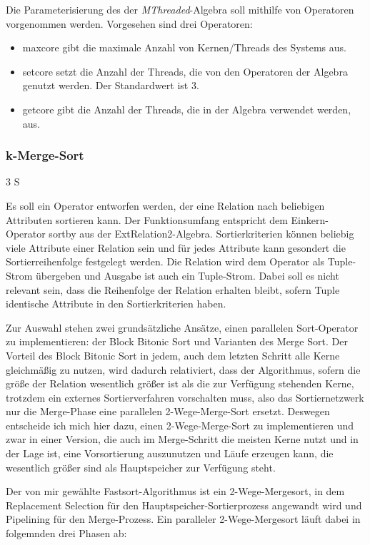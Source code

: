 \documentclass[a4paper,12pt,twoside]{article}
\newcommand{\Fb}[1]{\textit{#1}} %
\begin{document}
Die Parameterisierung des der \Fb{MThreaded}-Algebra soll mithilfe von Operatoren vorgenommen werden. Vorgesehen sind drei Operatoren:

\begin{itemize}
	\item maxcore gibt die maximale Anzahl von Kernen/Threads des Systems aus.
	\item setcore setzt die Anzahl der Threads, die von den Operatoren der Algebra genutzt werden. Der Standardwert ist 3.
	\item getcore gibt die Anzahl der Threads, die in der Algebra verwendet werden, aus.
\end{itemize}

\subsubsection{k-Merge-Sort} 3 S

Es soll ein Operator entworfen werden, der eine Relation nach beliebigen Attributen sortieren kann. Der Funktionsumfang entspricht dem Einkern-Operator sortby aus der ExtRelation2-Algebra. Sortierkriterien können beliebig viele Attribute einer Relation sein und für jedes Attribute kann gesondert die Sortierreihenfolge festgelegt werden. Die Relation wird dem Operator als Tuple-Strom übergeben und Ausgabe ist auch ein Tuple-Strom. Dabei soll es nicht relevant sein, dass die Reihenfolge der Relation erhalten bleibt, sofern Tuple identische Attribute in den Sortierkriterien haben.

Zur Auswahl stehen zwei grundsätzliche Ansätze, einen parallelen Sort-Operator zu implementieren: der Block Bitonic Sort und Varianten des Merge Sort. Der Vorteil des Block Bitonic Sort in jedem, auch dem letzten Schritt alle Kerne gleichmäßig zu nutzen, wird dadurch relativiert, dass der Algorithmus, sofern die größe der Relation wesentlich größer ist als die zur Verfügung stehenden Kerne, trotzdem ein externes Sortierverfahren vorschalten muss, also das Sortiernetzwerk nur die Merge-Phase eine parallelen 2-Wege-Merge-Sort ersetzt. Deswegen entscheide ich mich hier dazu, einen 2-Wege-Merge-Sort zu implementieren und zwar in einer Version, die auch im Merge-Schritt die meisten Kerne nutzt und in der Lage ist, eine Vorsortierung auszunutzen und Läufe erzeugen kann, die wesentlich größer sind als Hauptspeicher zur Verfügung steht.

Der von mir gewählte Fastsort-Algorithmus ist ein 2-Wege-Mergesort, in dem Replacement Selection für den Hauptspeicher-Sortierprozess angewandt wird und Pipelining für den Merge-Prozess. Ein paralleler 2-Wege-Mergesort läuft dabei in folgemnden drei Phasen ab:
\end{document}
